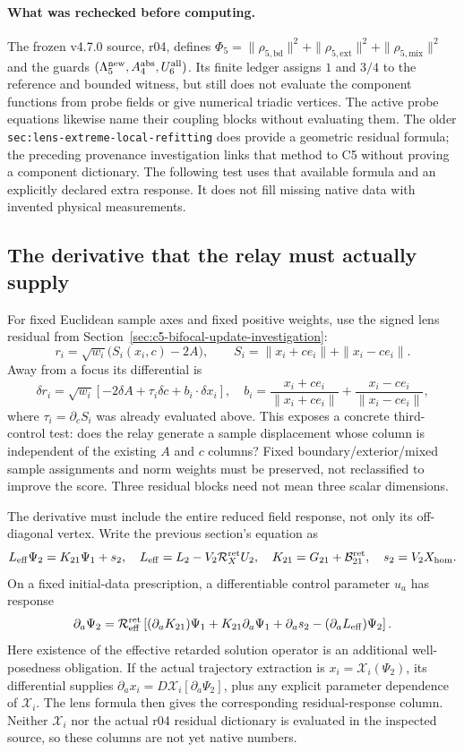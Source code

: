 \documentclass[11pt,a4paper]{article}
\begin{document}
\paragraph{What was rechecked before computing.}
The frozen v4.7.0 source, r04, defines
$\Phi_5=\|\rho_{5,\mathrm{bd}}\|^2+
\|\rho_{5,\mathrm{ext}}\|^2+\|\rho_{5,\mathrm{mix}}\|^2$
and the guards $(\Lambda_5^{\rm new},A_4^{\rm abs},U_6^{\rm all})$.
Its finite ledger assigns $1$ and $3/4$ to the reference and bounded
witness, but still does not evaluate the component functions from
probe fields or give numerical triadic vertices. The active probe
equations likewise name their coupling blocks without evaluating
them. The older \texttt{sec:lens-extreme-local-refitting} does provide
a geometric residual formula; the preceding provenance investigation
links that method to C5 without proving a component dictionary.
The following test uses that available formula and an explicitly
declared extra response. It does not fill missing native data with
invented physical measurements.

\subsection{The derivative that the relay must actually supply}

For fixed Euclidean sample axes and fixed positive weights, use the
signed lens residual from Section~\ref{sec:c5-bifocal-update-investigation}:
\[
 r_i=\sqrt{w_i}\bigl(S_i(x_i,c)-2A\bigr),\qquad
 S_i=\|x_i+ce_i\|+\|x_i-ce_i\|.
\]
Away from a focus its differential is
\[
 \delta r_i=\sqrt{w_i}\left[
 -2\delta A+\tau_i\delta c+b_i\cdot\delta x_i\right],
 \quad b_i=\frac{x_i+ce_i}{\|x_i+ce_i\|}
          +\frac{x_i-ce_i}{\|x_i-ce_i\|},
\]
where $\tau_i=\partial_cS_i$ was already evaluated above.
This exposes a concrete third-control test: does the relay generate
a sample displacement whose column is independent of the existing
$A$ and $c$ columns? Fixed boundary/exterior/mixed sample assignments
and norm weights must be preserved, not reclassified to improve the
score. Three residual blocks need not mean three scalar dimensions.

The derivative must include the entire reduced field response, not
only its off-diagonal vertex. Write the previous section's equation as
\[
 L_{\rm eff}\Psi_2=K_{21}\Psi_1+s_2,\quad
 L_{\rm eff}=L_2-V_2\mathcal R_X^{\rm ret}U_2,\quad
 K_{21}=G_{21}+\mathcal B_{21}^{\rm ret},\quad s_2=V_2X_{\rm hom}.
\]
On a fixed initial-data prescription, a differentiable control
parameter $u_a$ has response
\[
 \partial_a\Psi_2=\mathcal R_{\rm eff}^{\rm ret}
 \left[(\partial_aK_{21})\Psi_1+K_{21}\partial_a\Psi_1
       +\partial_as_2-(\partial_aL_{\rm eff})\Psi_2\right].
\]
Here existence of the effective retarded solution operator is an
additional well-posedness obligation. If the actual trajectory
extraction is $x_i=\mathcal X_i(\Psi_2)$, its differential supplies
$\partial_ax_i=D\mathcal X_i[\partial_a\Psi_2]$, plus any explicit
parameter dependence of $\mathcal X_i$. The lens formula then gives
the corresponding residual-response column. Neither
$\mathcal X_i$ nor the actual r04 residual dictionary is evaluated
in the inspected source, so these columns are not yet native numbers.
\end{document}
